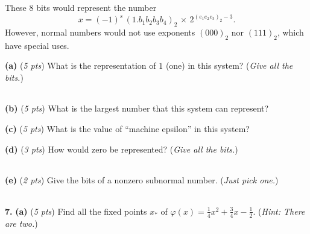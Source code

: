 \documentclass[11pt]{amsart}
\newcommand{\prob}[1]{\bigskip\noindent\textbf{#1.} }
\newcommand{\pts}[1]{(\emph{#1 pts})}
\newcommand{\ppartpts}[2]{\textbf{(#1)} \pts{#2} \quad}
\newcommand{\epartpts}[2]{\medskip\noindent \textbf{(#1)} \pts{#2} \quad}
\begin{document}
\noindent These 8 bits would represent the number
\medskip\large
\begin{equation*}
	x = (-1)^s\,(1.b_1 b_2 b_3 b_4)_2 \,\times\, 2^{(e_1 e_2 e_3)_2 - 3}.
\end{equation*}
However, normal numbers would not use exponents $(000)_2$ nor $(111)_2$, which have special uses.
\normalsize

\medskip
\epartpts{a}{5}  What is the representation of $1$ (one) in this system?  (\emph{Give all the bits.})
\vspace{0.8in}

\hfill \begin{tabular}{|c|c|c|c|c|c|c|c|} \hline
\phantom{$m$} & \phantom{$m$} & \phantom{$m$} & \phantom{$m$} & \phantom{$m$} & \phantom{$m$} & \phantom{$m$} & \phantom{$a$} \LARGE \strut \\ \hline
\end{tabular}

\bigskip
\epartpts{b}{5}  What is the largest number that this system can represent?
\vspace{1.8in}

\epartpts{c}{5}  What is the value of ``machine epsilon'' in this system?
\vfill

\epartpts{d}{3}  How would zero be represented?  (\emph{Give all the bits.})
\vspace{15mm}

\hfill \begin{tabular}{|c|c|c|c|c|c|c|c|} \hline
\phantom{$m$} & \phantom{$m$} & \phantom{$m$} & \phantom{$m$} & \phantom{$m$} & \phantom{$m$} & \phantom{$m$} & \phantom{$a$} \LARGE \strut \\ \hline
\end{tabular}

\bigskip
\epartpts{e}{2}  Give the bits of a nonzero subnormal number.  (\emph{Just pick one.})
\vspace{15mm}

\hfill \begin{tabular}{|c|c|c|c|c|c|c|c|} \hline
\phantom{$m$} & \phantom{$m$} & \phantom{$m$} & \phantom{$m$} & \phantom{$m$} & \phantom{$m$} & \phantom{$m$} & \phantom{$a$} \LARGE \strut \\ \hline
\end{tabular}


\newpage
\prob{7}  \ppartpts{a}{5} Find all the fixed points $x_\ast$ of $\varphi(x) = \frac{1}{4} x^2 + \frac{3}{4} x - \frac{1}{2}$.  (\emph{Hint:  There are two.})
\vspace{3.0in}
\end{document}
